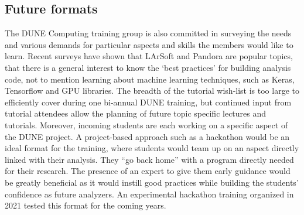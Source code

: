 \documentclass[../main-v1.tex]{subfiles}
\begin{document}
\subsection{Future formats}
The DUNE Computing training group is also committed in surveying the needs and various demands for particular aspects and skills the members would like to learn. Recent surveys have shown that LArSoft and Pandora are popular topics, that there is a general interest to know the ‘best practices’ for building analysis code, not to mention learning about machine learning techniques, such as Keras, Tensorflow and GPU libraries. The breadth of the tutorial wish-list is too large to efficiently cover during one bi-annual DUNE training, but continued input from tutorial attendees allow the planning of future topic specific lectures and tutorials. Moreover, incoming students are each working on a specific aspect of the DUNE project. A project-based approach such as a hackathon would be an ideal format for the training, where students would team up on an aspect directly linked with their analysis. They ``go back home'' with a program directly needed for their research. The presence of an expert to give them early guidance would be greatly beneficial as it would instill good practices while building the students' confidence as future analyzers. An experimental hackathon training organized in 2021 tested this format for the coming years.



\end{document}
